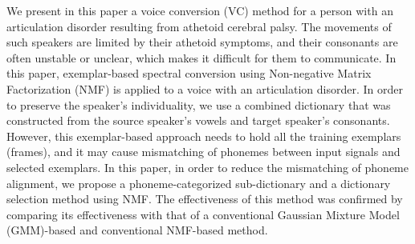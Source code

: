 We present in this paper a voice conversion (VC) method for a person with an articulation disorder resulting from athetoid cerebral palsy. The movements of such speakers are limited by their athetoid symptoms, and their consonants are often unstable or unclear, which makes it difficult for them to communicate. In this paper, exemplar-based spectral conversion using Non-negative Matrix Factorization (NMF) is applied to a voice with an articulation disorder. In order to preserve the speaker's individuality, we use a combined dictionary that was constructed from the source speaker's vowels and target speaker's consonants. However, this exemplar-based approach needs to hold all the training exemplars (frames), and it may cause mismatching of phonemes between input signals and selected exemplars. In this paper, in order to reduce the mismatching of phoneme alignment, we propose a phoneme-categorized sub-dictionary and a dictionary selection method using NMF. The effectiveness of this method was confirmed by comparing its effectiveness with that of a conventional Gaussian Mixture Model (GMM)-based and conventional NMF-based method.
